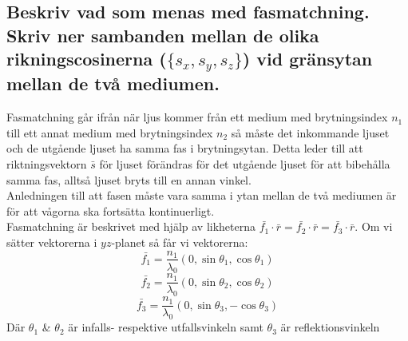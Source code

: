 \documentclass{article}
\begin{document}
  \subsection*{Beskriv vad som menas med fasmatchning. Skriv ner sambanden mellan de olika rikningscosinerna ($\{s_x,s_y,s_z\}$) vid gränsytan mellan de två mediumen.}
    Fasmatchning går ifrån när ljus kommer från ett medium med brytningsindex $n_1$ till ett annat medium med brytningsindex $n_2$ så måste det inkommande ljuset och de utgående ljuset ha samma fas i brytningsytan. Detta leder till att riktningsvektorn $\bar{s}$ för ljuset förändras för det utgående ljuset för att bibehålla samma fas, alltså ljuset bryts till en annan vinkel.\\
    Anledningen till att fasen måste vara samma i ytan mellan de två mediumen är för att vågorna ska fortsätta kontinuerligt.\\

    Fasmatchning är beskrivet med hjälp av likheterna $\bar{f_1}\cdot\bar{r} = \bar{f_2}\cdot\bar{r} = \bar{f_3}\cdot\bar{r}$. Om vi sätter vektorerna i $yz$-planet så får vi vektorerna:
    \[
      \bar{f_1}=\frac{n_1}{\lambda_0}(0,\sin{\theta_1}, \cos{\theta_1})
    \]
    \[
      \bar{f_2}=\frac{n_1}{\lambda_0}(0,\sin{\theta_2}, \cos{\theta_2})
    \]
    \[
      \bar{f_3}=\frac{n_1}{\lambda_0}(0,\sin{\theta_3}, -\cos{\theta_3})
    \]
    Där $\theta_1$ \& $\theta_2$ är infalls- respektive utfallsvinkeln samt $\theta_3$ är reflektionsvinkeln
\end{document}
